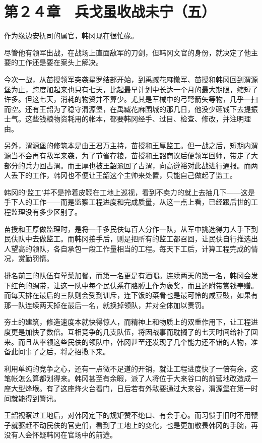 \section{第２４章　兵戈虽收战未宁（五）}

作为缘边安抚司的属官，韩冈现在很忙碌。

尽管他有领军出战，在战场上直面敌军的刀剑，但韩冈文官的身份，就决定了他主要的工作还是要在案头上解决。

今次一战，从苗授领军突袭星罗结部开始，到禹臧花麻撤军、苗授和韩冈回到渭源堡为止，跨度加起来也只有七天，比起最早计划中长达一个月的最大期限，缩短了许多。但这七天，消耗的物资并不算少。尤其是军械中的弓弩箭矢等物，几乎一扫而空。还有王韶为了稳守渭源堡，在禹臧花麻围城的那几日，他没少砸钱下去提振士气。这些钱粮物资耗用的帐本，都要韩冈经手、过目、检查、修改，并注明理由。

另外，渭源堡的修筑本是由王君万主持，苗授和王厚监工。但一战之后，短期内渭源当不会再有敌军来袭，为了节省存粮，苗授和王韶商议后便领军回师，带走了大部分的兵力回古渭。而王厚也被王韶派回了古渭，向高遵裕对此战进行通报。而两人丢下的工作，韩冈也不便让王韶这个主帅来处置，只能自己做起了监工。

韩冈的‘监工’并不是拎着皮鞭在工地上巡视，看到不卖力的就上去抽几下——这是手下人的工作——而是监察工程进度和完成质量，从这一点上看，已经跟后世的工程监理没有多少区别了。

苗授和王厚做监理时，是将一千多民伕每百人分作一队，从军中挑选得力人手下到民伕队中去做监工。而韩冈接手后，则是把所有的监工都召回，让民伕自行推选出人望高的领队，各自承包一段工作量相当的工程。每天下工后，计算工程完成的情况，赏勤罚惰。

排名前三的队伍有荤菜加餐，而第一名更是有酒喝。连续两天的第一名，韩冈会发下红色的绸带，让这一队中每个民伕系在胳膊上作为褒奖，而且还附带赏钱奉赠。而每天排在最后的三队则会受到训斥，连下饭的菜肴也是最可怜的咸豆豉，如果有那一队连续两天掉在最后一名，就换掉领队，并对全体加以责罚。

夯土的建筑，修造速度本就快得惊人，而精神上和物质上的双重作用下，让工程进度更是加快了数倍。互相竞争的几支队伍，将因战事而耽搁了的七天时间给补了回来。而且从率领这些民伕的领队中，韩冈甚至还发现了几个能力还不错的人物，准备此间事了之后，将之招揽下来。

利用单纯的竞争之心，还有一点微不足道的开销，就让工程进度快了一倍有余，这笔帐怎么算都划得来。韩冈甚至有余暇，派了人将位于大来谷口的前营地改造成一座大型烽堠。有了这座烽火台看门，日后若有外敌要通过大来谷，渭源堡在第一时间就能得到警讯。

王韶视察过工地后，对韩冈定下的规矩赞不绝口、有会于心。而习惯于旧时不用鞭子就驱赶不动民伕的官吏们，看到了工地上的变化，也是更加敬畏韩冈的手腕，再没有人会怀疑韩冈在官场中的前途。


